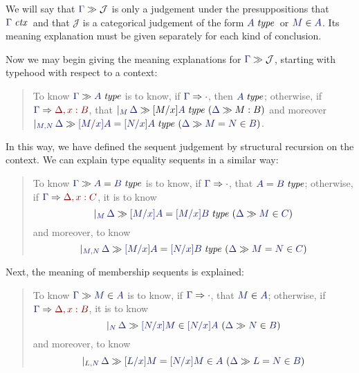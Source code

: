 \documentclass[main.tex]{subfiles}
\begin{document}
We will say that $\sequent{\Gamma}{\mathcal{J}}$ is only a judgement
under the presuppositions that $\isctx\Gamma$\ and that $\mathcal{J}$
is a categorical judgement of the form $\isset{A}$\ or
$\ver{M}{A}$. Its meaning explanation must be given separately for
each kind of conclusion.

Now we may begin giving the meaning explanations for
$\sequent{\Gamma}{\mathcal{J}}$, starting with typehood with respect to a context:

\begin{quote}

  To know $\sequent{\Gamma}{\isset{A}}$ is to know, if
$\reduce{\Gamma}{\cdot}$, then $\isset{A}$; otherwise, if
$\reduce{\Gamma}{\Delta,x:B}$, that
$\genj{M}{\hyp{\sequent{\Delta}{[M/x]\isset{A}}}{\sequent{\Delta}{M:B}}}$
and moreover
$\genj{M,N}{\hyp{\sequent{\Delta}{\eisset{[M/x]A}{[N/x]A}}}{\sequent{\Delta}{\ever{M}{N}{B}}}}$.

\end{quote}

In this way, we have defined the sequent judgement by structural
recursion on the context. We can explain type equality sequents in a
similar way:

\begin{quote}
  To know $\sequent{\Gamma}{\eisset{A}{B}}$ is to know, if $\reduce{\Gamma}{\cdot}$, that $\eisset{A}{B}$; otherwise, if $\reduce{\Gamma}{\Delta,x:C}$, it is to know
  \[
    \genj{M}{
      \hyp{
        \sequent{\Delta}{
          \eisset{[M/x]A}{[M/x]B}
        }
      }{
        \sequent{\Delta}{
          \ver{M}{C}
        }
      }
    }
  \]
  and moreover, to know
  \[
    \genj{M,N}{
      \hyp{
        \sequent{\Delta}{
          \eisset{[M/x]A}{[N/x]B}
        }
      }{
        \sequent{\Delta}{
          \ever{M}{N}{C}
        }
      }
    }
  \]
\end{quote}

Next, the meaning of membership sequents is explained:

\begin{quote}
  To know $\sequent{\Gamma}{\ver{M}{A}}$ is to know, if
  $\reduce\Gamma\cdot$, that $\ver{M}{A}$; otherwise, if
  $\reduce{\Gamma}{\Delta,x:B}$, it is to know
  \[
    \genj{N}{
      \hyp{
        \sequent{\Delta}{
          \ver{[N/x]M}{[N/x]A}
        }
      }{
        \sequent{\Delta}{
          \ver{N}{B}
        }
      }
    }
  \]
  and moreover, to know
  \[
    \genj{L,N}{
      \hyp{
        \sequent{\Delta}{
          \ever{[L/x]M}{[N/x]M}{A}
        }
      }{
        \sequent{\Delta}{
          \ever{L}{N}{B}
        }
      }
    }
  \]
\end{quote}
\end{document}
